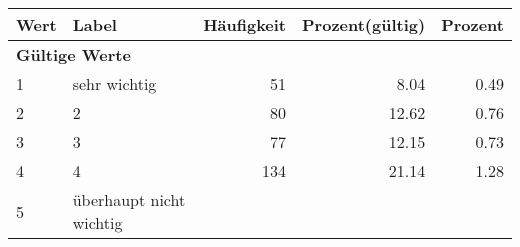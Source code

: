      \begin{longtable}{lXrrr}
     \toprule
     \textbf{Wert} & \textbf{Label} & \textbf{Häufigkeit} & \textbf{Prozent(gültig)} & \textbf{Prozent} \\
     \endhead
     \midrule
     \multicolumn{5}{l}{\textbf{Gültige Werte}}\\

     1 &
     \multicolumn{1}{X}{ sehr wichtig   } &


       \num{51} &
       \num[round-mode=places,round-precision=2]{8.04} &
         \num[round-mode=places,round-precision=2]{0.49} \\

     2 &
     \multicolumn{1}{X}{ 2   } &


       \num{80} &
       \num[round-mode=places,round-precision=2]{12.62} &
         \num[round-mode=places,round-precision=2]{0.76} \\

     3 &
     \multicolumn{1}{X}{ 3   } &


       \num{77} &
       \num[round-mode=places,round-precision=2]{12.15} &
         \num[round-mode=places,round-precision=2]{0.73} \\

     4 &
     \multicolumn{1}{X}{ 4   } &


       \num{134} &
       \num[round-mode=places,round-precision=2]{21.14} &
         \num[round-mode=places,round-precision=2]{1.28} \\

     5 &
     \multicolumn{1}{X}{ überhaupt nicht wichtig   } &



\end{longtable}
